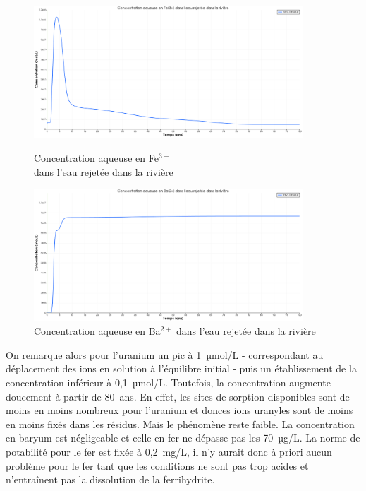 \documentclass{article}
\begin{document}
\begin{figure}[H]
    \centering
    \begin{minipage}{0.5\textwidth}
        \centering
        \includegraphics[width=0.9\textwidth]{III_B_2_7.png} 
        \caption{Concentration aqueuse en Fe$^{3+}$ \\dans l'eau rejetée dans la rivière}
        \label{fig:Fe_riviere_sable_Base}
    \end{minipage}\hfill
    \begin{minipage}{0.5\textwidth}
        \centering
        \includegraphics[width=0.9\textwidth]{III_B_2_8.png} 
        \caption{Concentration aqueuse en Ba$^{2+}$ dans l'eau rejetée dans la rivière}
        \label{fig:Ba_riviere_sable_base}
    \end{minipage}
\end{figure}


On remarque alors pour l’uranium un pic à 1~µmol/L - correspondant au déplacement des ions en solution à l’équilibre initial - puis un établissement de la concentration inférieur à 0,1~µmol/L. Toutefois, la concentration augmente doucement à partir de 80~ans. En effet, les sites de sorption disponibles sont de moins en moins nombreux pour l'uranium et donces ions uranyles sont de moins en moins fixés dans les résidus. Mais le phénomène reste faible. La concentration en baryum est négligeable et celle en fer ne dépasse pas les 70~µg/L. La norme de potabilité pour le fer est fixée à 0,2~mg/L, il n’y aurait donc à priori aucun problème pour le fer tant que les conditions ne sont pas trop acides et n'entraînent pas la dissolution de la ferrihydrite.
\end{document}
